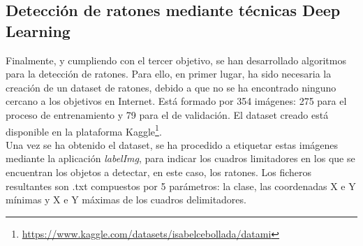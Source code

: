 \subsection{Detección de ratones mediante técnicas Deep Learning}
Finalmente, y cumpliendo con el tercer objetivo, se han desarrollado algoritmos para la detección de ratones. Para ello, en primer lugar, ha sido necesaria la creación de un dataset de ratones, debido a que no se ha encontrado ninguno cercano a los objetivos en Internet. Está formado por 354 imágenes: 275 para el proceso de entrenamiento y 79 para el de validación. El dataset creado está disponible en la plataforma Kaggle\footnote{\url{https://www.kaggle.com/datasets/isabelcebollada/datami}}.\\

Una vez se ha obtenido el dataset, se ha procedido a etiquetar estas imágenes mediante la aplicación \textit{labelImg}, para indicar los cuadros limitadores en los que se encuentran los objetos a detectar, en este caso, los ratones. Los ficheros resultantes son .txt compuestos por 5 parámetros: la clase, las coordenadas X e Y mínimas y X e Y máximas de los cuadros delimitadores.\\

